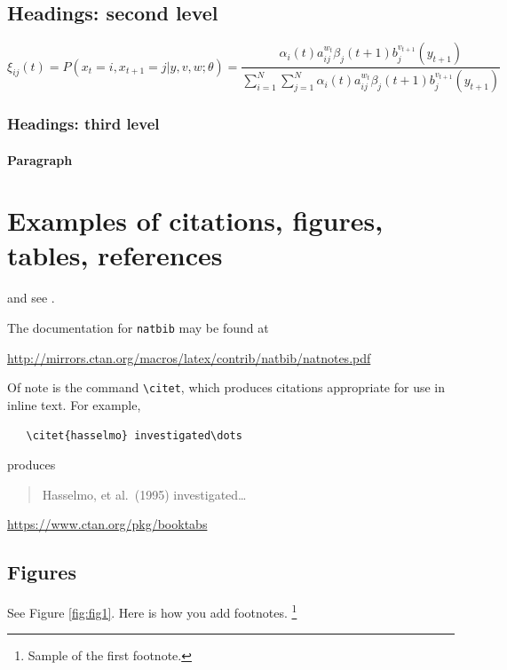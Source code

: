 \documentclass{article}
\begin{document}
\subsection{Headings: second level}
\lipsum[5]
\begin{equation}
\xi _{ij}(t)=P(x_{t}=i,x_{t+1}=j|y,v,w;\theta)= {\frac {\alpha _{i}(t)a^{w_t}_{ij}\beta _{j}(t+1)b^{v_{t+1}}_{j}(y_{t+1})}{\sum _{i=1}^{N} \sum _{j=1}^{N} \alpha _{i}(t)a^{w_t}_{ij}\beta _{j}(t+1)b^{v_{t+1}}_{j}(y_{t+1})}}
\end{equation}

\subsubsection{Headings: third level}
\lipsum[6]

\paragraph{Paragraph}
\lipsum[7]

\section{Examples of citations, figures, tables, references}
\label{sec:others}
\lipsum[8] \cite{kour2014real,kour2014fast} and see \cite{hadash2018estimate}.

The documentation for \verb+natbib+ may be found at
\begin{center}
  \url{http://mirrors.ctan.org/macros/latex/contrib/natbib/natnotes.pdf}
\end{center}
Of note is the command \verb+\citet+, which produces citations
appropriate for use in inline text.  For example,
\begin{verbatim}
   \citet{hasselmo} investigated\dots
\end{verbatim}
produces
\begin{quote}
  Hasselmo, et al.\ (1995) investigated\dots
\end{quote}

\begin{center}
  \url{https://www.ctan.org/pkg/booktabs}
\end{center}


\subsection{Figures}
\lipsum[10]
See Figure \ref{fig:fig1}. Here is how you add footnotes. \footnote{Sample of the first footnote.}
\lipsum[11]
\end{document}
